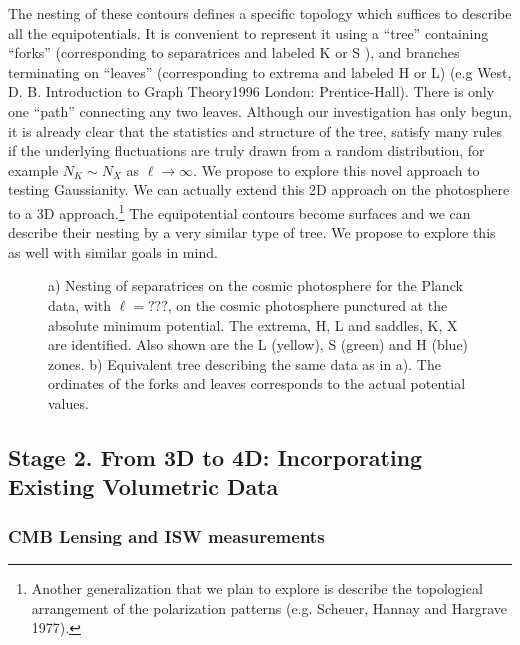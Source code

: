 \documentclass[psfig,11pt]{article}
\begin{document}
The nesting of these contours defines a specific topology which suffices to describe all the equipotentials. It is convenient to represent it using a ``tree'' containing ``forks'' (corresponding to separatrices and labeled K or S ), and branches terminating on ``leaves'' (corresponding to extrema and labeled H or L) (e.g West, D. B. Introduction to Graph Theory1996 London: Prentice-Hall). There is only one ``path'' connecting any two leaves. Although our investigation has only begun, it is already clear that the statistics and structure of the tree, satisfy many rules if the underlying fluctuations are truly drawn from a random distribution, for example $N_K\sim N_X$ as $\ell\rightarrow\infty$. We propose to explore this novel approach to testing Gaussianity. We can actually extend this 2D approach on the photosphere to a 3D approach.\footnote{Another generalization that we plan to explore is describe the topological arrangement of the polarization patterns (e.g. Scheuer, Hannay and Hargrave 1977).} The equipotential contours become surfaces and we can describe their nesting by a very similar type of tree. We propose to explore this as well with similar goals in mind.
\begin{figure}[t]
\centering
\caption{a) Nesting of separatrices on the cosmic photosphere for the Planck data, with $\ell=???$, on the cosmic photosphere punctured at the absolute minimum potential. The extrema, H, L and saddles, K, X are identified. Also shown are the L (yellow), S (green) and H (blue) zones. b) Equivalent tree describing the same data as in a). The ordinates of the forks and leaves corresponds to the actual potential values.}
\end{figure}


\subsection{Stage 2. From 3D to 4D: Incorporating Existing Volumetric Data}

\subsubsection{CMB Lensing and ISW measurements}
\end{document}
